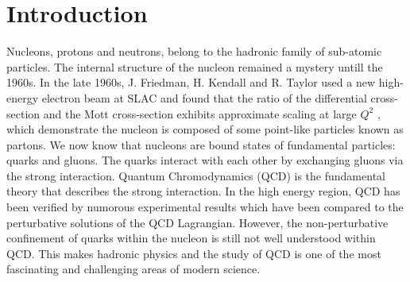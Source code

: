 

\chapter{Introduction}
\label{C1}

Nucleons, protons and neutrons, belong to the hadronic family of sub-atomic particles. The internal structure of the nucleon remained a mystery untill the 1960s. In the late 1960s, J. Friedman, H. Kendall and R. Taylor used a new high-energy electron beam at SLAC and found that the ratio of the differential cross-section and the Mott cross-section exhibits approximate scaling at large $Q^2$ \cite{Breidenbach1969}, which demonstrate the nucleon is composed of some point-like particles known as partons. We now know that nucleons are bound states of fundamental particles: quarks and gluons. The quarks interact with each other by exchanging gluons via the strong interaction. Quantum Chromodynamics (QCD) is the fundamental theory that describes the strong interaction. In the high energy region, QCD has been verified by numorous experimental results which have been compared to the perturbative solutions of the QCD Lagrangian. However, the non-perturbative confinement of quarks within the nucleon is still not well understood within QCD. This makes hadronic physics and the study of QCD is one of the most fascinating and challenging areas of modern science.

